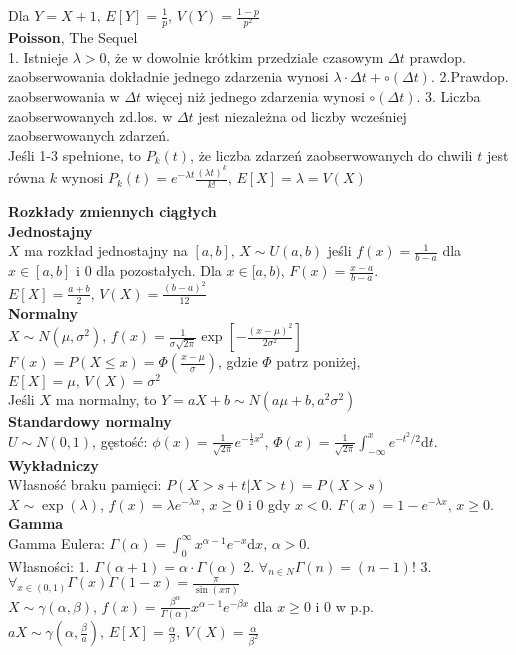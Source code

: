 \documentclass[10pt,landscape,a4paper,notitlepage]{article}
\begin{document}
\begin{multicols*}{4}
        Dla $Y=X+1,\,E[Y]=\frac{1}{p},\,V(Y)=\frac{1-p}{p^2}$\\
        \textbf{Poisson}, The Sequel\\
        1. Istnieje $\lambda>0$, że w dowolnie krótkim przedziale czasowym $\Delta t$ prawdop. zaobserwowania dokładnie jednego zdarzenia wynosi $\lambda\cdot\Delta t+\circ(\Delta t)$.
        2.Prawdop. zaobserwowania w $\Delta t$ więcej niż jednego zdarzenia wynosi $\circ(\Delta t)$.
        3. Liczba zaobserwowanych zd.los. w $\Delta t$ jest niezależna od liczby wcześniej zaobserwowanych zdarzeń.\\
        Jeśli 1-3 spełnione, to $P_k(t)$, że liczba zdarzeń zaobserwowanych do chwili $t$ jest równa $k$ wynosi $P_k(t)=e^{-\lambda t}\frac{(\lambda t)^k}{k!},\,E[X]=\lambda=V(X)$

        \noindent\textbf{\large Rozkłady zmiennych ciągłych}\\
        \textbf{Jednostajny}\\
        $X$ ma rozkład jednostajny na $[a,b],\,X\sim U(a,b)$ jeśli $f(x)=\frac{1}{b-a}$ dla $x\in[a,b]$ i $0$ dla pozostałych.
        Dla $x\in[a,b),\,F(x)=\frac{x-a}{b-a}$.\\
        $E[X]=\frac{a+b}{2},\,V(X)=\frac{(b-a)^2}{12}$\\
        \textbf{Normalny}\\
        $X\sim N(\mu, \sigma^2),\,f(x)=\frac{1}{\sigma\sqrt{2\pi}}\exp\left[-\frac{(x-\mu)^2}{2\sigma^2}\right]$\\
        $F(x)=P(X\leq x)=\Phi(\frac{x-\mu}{\sigma})$, gdzie $\Phi$ patrz poniżej,
        $E[X]=\mu,\,V(X)=\sigma^2$\\
        Jeśli $X$ ma normalny, to $Y=aX+b\sim N(a\mu+b,a^2\sigma^2)$\\
        \textbf{Standardowy normalny}\\
        $U\sim N(0,1)$, gęstość: $\phi(x)=\frac{1}{\sqrt{2\pi}}e^{-\frac{1}{2}x^2}$, $\Phi(x)=\frac{1}{\sqrt{2\pi}}\int_{-\infty}^xe^{-t^2/2}\mathrm{d}t$.\\
        \textbf{Wykładniczy}\\
        Własność braku pamięci: $P(X>s+t|X>t)=P(X>s)$\\
        $X\sim \exp(\lambda)$, $f(x)=\lambda e^{-\lambda x},\,x\geq 0$ i $0$ gdy $x<0$.
        $F(x)=1-e^{-\lambda x},\,x\geq 0$.\\
        \textbf{Gamma}\\
        Gamma Eulera: $\Gamma(\alpha)=\int_0^{\infty}x^{\alpha-1}e^{-x}\mathrm{d}x,\,\alpha>0$.\\
        Własności:
        1. $\Gamma(\alpha+1)=\alpha\cdot\Gamma(\alpha)$
        2. $\forall_{n\in N}\Gamma(n)=(n-1)!$
        3. $\forall_{x\in(0,1)}\Gamma(x)\Gamma(1-x)=\frac{\pi}{\sin(x\pi)}$\\
        $X\sim \gamma(\alpha,\beta),\,f(x)=\frac{\beta^{\alpha}}{\Gamma(\alpha)}x^{\alpha-1}e^{-\beta x}$ dla $x\geq 0$ i $0$ w p.p.\\
        $aX\sim\gamma(\alpha,\frac{\beta}{a}),\,E[X]=\frac{\alpha}{\beta},\,V(X)=\frac{\alpha}{\beta^2}$


\end{multicols*}
\end{document}
